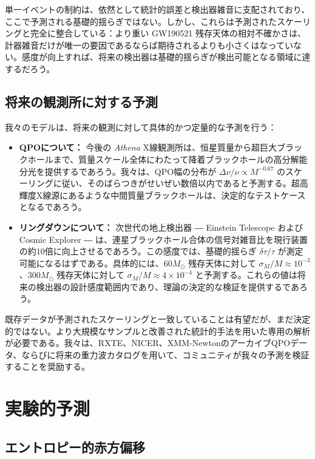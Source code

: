 \documentclass[12pt,a4paper]{article}
\begin{document}
	単一イベントの制約は、依然として統計的誤差と検出器雑音に支配されており、ここで予測される基礎的揺らぎではない。しかし、これらは予測されたスケーリングと完全に整合している：より重い GW190521 残存天体の相対不確かさは、計器雑音だけが唯一の要因であるならば期待されるよりも小さくはなっていない。感度が向上すれば、将来の検出器は基礎的揺らぎが検出可能となる領域に達するだろう。
	
	\subsection{将来の観測所に対する予測}
	
	我々のモデルは、将来の観測に対して具体的かつ定量的な予測を行う：
	
	\begin{itemize}
		\item \textbf{QPOについて：} 今後の \textit{Athena} X線観測所は、恒星質量から超巨大ブラックホールまで、質量スケール全体にわたって降着ブラックホールの高分解能分光を提供するであろう。我々は、QPO幅の分布が \(\Delta\nu/\nu \propto M^{-0.67}\) のスケーリングに従い、そのばらつきがせいぜい数倍以内であると予測する。超高輝度X線源にあるような中間質量ブラックホールは、決定的なテストケースとなるであろう。
		
		\item \textbf{リングダウンについて：} 次世代の地上検出器 ― Einstein Telescope および Cosmic Explorer ― は、連星ブラックホール合体の信号対雑音比を現行装置の約10倍に向上させるであろう。この感度では、基礎的揺らぎ \(\delta\tau/\tau\) が測定可能になるはずである。具体的には、\(60 M_\odot\) 残存天体に対して \(\sigma_M/M \approx 10^{-3}\)、\(300 M_\odot\) 残存天体に対して \(\sigma_M/M \approx 4 \times 10^{-4}\) と予測する。これらの値は将来の検出器の設計感度範囲内であり、理論の決定的な検証を提供するであろう。
	\end{itemize}
	
	既存データが予測されたスケーリングと一致していることは有望だが、まだ決定的ではない。より大規模なサンプルと改善された統計的手法を用いた専用の解析が必要である。我々は、RXTE、NICER、XMM-NewtonのアーカイブQPOデータ、ならびに将来の重力波カタログを用いて、コミュニティが我々の予測を検証することを奨励する。
	
	\section{実験的予測}
	\label{sec:predictions}
	
	\subsection{エントロピー的赤方偏移}
	
\end{document}
